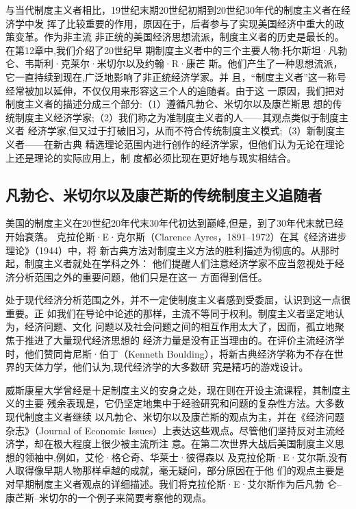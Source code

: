 与当代制度主义者相比，19世纪末期20世纪初期到20世纪30年代的制度主义者在经济学中发
挥了比较重要的作用，原因在于，后者参与了实现美国经济中重大的政策变革。作为非主流
非正统的美国经济思想流派，制度主义者的历史是最长的。在第12章中,我们介绍了20世纪早
期制度主义者中的三个主要人物:托尔斯坦·凡勃仑、韦斯利·克莱尔·米切尔以及约翰·R·康芒
斯。他们产生了一种思想流派，它一直持续到现在,广泛地影响了非正统经济学家。并
且，“制度主义者”这一称号经常被加以延伸，不仅仅用来形容这三个人的追随者。由于这
一原因，我们把对制度主义者的描述分成三个部分:（1）遵循凡勃仑、米切尔以及康芒斯思
想的传统制度主义经济学家;（2）我们称之为准制度主义者的人——其观点类似于制度主义者
经济学家,但又过于打破旧习，从而不符合传统制度主义模式;（3）新制度主义者——在新古典
精选理论范围内进行创作的经济学家，但他们认为无论在理论上还是理论的实际应用上，制
度都必须比现在更好地与现实相结合。

\subsection{凡勃仑、米切尔以及康芒斯的传统制度主义追随者}

美国的制度主义在20世纪20年代末30年代初达到巅峰,但是，到了30年代末就已经开始衰落。
克拉伦斯·E·克尔斯（Clarence Ayres，1891--1972）在其《经济进步理论》（1944）中，将
新古典方法对制度主义方法的胜利描述为彻底的。从那时起，制度主义者就处在学科之外：
他们提醒人们注意经济学家不应当忽视处于经济分析范围之外的重要问题，他们只是在这一
方面得到信任。

处于现代经济分析范围之外，并不一定使制度主义者感到受委屈，认识到这一点很重要。正
如我们在导论中论述的那样，主流不等同于权利。制度主义者坚定地认为，经济问题、文化
问题以及社会问题之间的相互作用太大了，因而，孤立地聚焦于推进了大量现代经济思想的
经济力量是没有正当理由的。在评价主流经济学时，他们赞同肯尼斯·伯丁（Kenneth
Boulding），将新古典经济学称为不存在世界的天体力学，他们认为,现代经济学的大多数研
究是精巧的游戏设计。

威斯康星大学曾经是十足制度主义的安身之处，现在则在开设主流课程，其制度主义的主要
残余表现是，它仍坚定地集中于经验研究和问题的复杂性方法。大多数现代制度主义者继续
以凡勃仑、米切尔以及康芒斯的观点为主，并在《经济问题杂志》（Journal of Economic
Issues）上表达这些观点。尽管他们坚持反对主流经济学，却在极大程度上很少被主流所注
意。在第二次世界大战后美国制度主义思想的领袖中,例如，艾伦·格仑奇、华莱士·彼得森以
及克拉伦斯·E·艾尔斯,没有人取得像早期人物那样卓越的成就，毫无疑问，部分原因在于他
们的观点主要是对早期制度主义者观点的详细描述。我们将克拉伦斯·E·艾尔斯作为后凡勃
仑--康芒斯--米切尔的一个例子来简要考察他的观点。


